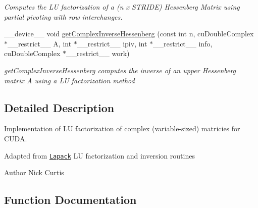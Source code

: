 \begin{DoxyCompactItemize}
\begin{DoxyCompactList}\small\item\em Computes the LU factorization of a (n x S\+T\+R\+I\+DE) Hessenberg Matrix using partial pivoting with row interchanges. \end{DoxyCompactList}\item 
\+\_\+\+\_\+device\+\_\+\+\_\+ void \hyperlink{complexInverse_8cu_a33419af3f2b7c5b53f2745d8b7f3cbe1}{get\+Complex\+Inverse\+Hessenberg} (const int n, cu\+Double\+Complex $\ast$\+\_\+\+\_\+restrict\+\_\+\+\_\+ A, int $\ast$\+\_\+\+\_\+restrict\+\_\+\+\_\+ ipiv, int $\ast$\+\_\+\+\_\+restrict\+\_\+\+\_\+ info, cu\+Double\+Complex $\ast$\+\_\+\+\_\+restrict\+\_\+\+\_\+ work)
\begin{DoxyCompactList}\small\item\em get\+Complex\+Inverse\+Hessenberg computes the inverse of an upper Hessenberg matrix A using a LU factorization method \end{DoxyCompactList}\end{DoxyCompactItemize}


\subsection{Detailed Description}
Implementation of LU factorization of complex (variable-\/sized) matricies for C\+U\+DA. 

Adapted from \href{http://www.netlib.org/lapack/}{\tt Lapack} LU factorization and inversion routines \begin{DoxyAuthor}{Author}
Nick Curtis 
\end{DoxyAuthor}


\subsection{Function Documentation}
